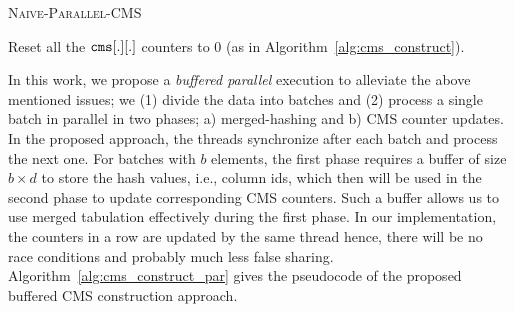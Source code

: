 \documentclass[runningheads]{llncs}
\begin{document}
\renewcommand{\baselinestretch}{0.9}
 \begin{algorithm}[htbp]
  	\small
  	\caption{\textsc{Naive-Parallel-CMS}} 
  	\SetAlgoNoLine
		Reset all the ${\tt cms}[.][.]$ counters to 0 (as in Algorithm~\ref{alg:cms_construct}).\\
	\label{alg:cms_construct_par_nobuf}
\end{algorithm} 	
\renewcommand{\baselinestretch}{1}


In this work, we propose a {\em buffered parallel} execution to alleviate the above mentioned issues; we (1) divide the data into batches and (2) process a single batch in parallel in two phases; a) merged-hashing and b) CMS counter updates. In the proposed approach, the threads synchronize after each batch and process the next one. For batches with $b$ elements, the first phase requires a buffer of size $b \times d$ to store the hash values, i.e., column ids, which then will be used in the second phase to update corresponding CMS counters. Such a buffer allows us to use merged tabulation effectively during the first phase. In our implementation, the counters in a row are updated by the same thread hence, there will be no race conditions and probably much less false sharing. Algorithm~\ref{alg:cms_construct_par} gives the pseudocode of the proposed buffered CMS construction approach. 
\end{document}
